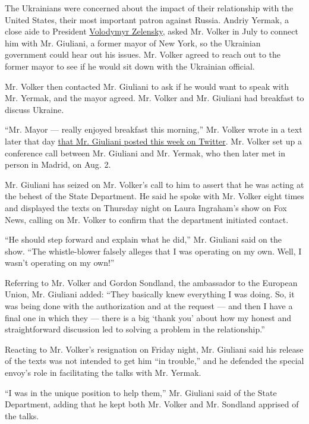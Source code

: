 The Ukrainians were concerned about the impact of their relationship
with the United States, their most important patron against Russia.
Andriy Yermak, a close aide to President
\href{https://www.nytimes.com/2019/09/25/world/europe/ukraine-trump-whistleblower-zelensky.html?module=inline}{Volodymyr
Zelensky}, asked Mr. Volker in July to connect him with Mr. Giuliani, a
former mayor of New York, so the Ukrainian government could hear out his
issues. Mr. Volker agreed to reach out to the former mayor to see if he
would sit down with the Ukrainian official.

Mr. Volker then contacted Mr. Giuliani to ask if he would want to speak
with Mr. Yermak, and the mayor agreed. Mr. Volker and Mr. Giuliani had
breakfast to discuss Ukraine.

``Mr. Mayor --- really enjoyed breakfast this morning,'' Mr. Volker
wrote in a text later that day
\href{https://twitter.com/RudyGiuliani/status/1177346278004539392}{that
Mr. Giuliani posted this week on Twitter}. Mr. Volker set up a
conference call between Mr. Giuliani and Mr. Yermak, who then later met
in person in Madrid, on Aug. 2.

Mr. Giuliani has seized on Mr. Volker's call to him to assert that he
was acting at the behest of the State Department. He said he spoke with
Mr. Volker eight times and displayed the texts on Thursday night on
Laura Ingraham's show on Fox News, calling on Mr. Volker to confirm that
the department initiated contact.

``He should step forward and explain what he did,'' Mr. Giuliani said on
the show. ``The whistle-blower falsely alleges that I was operating on
my own. Well, I wasn't operating on my own!''

Referring to Mr. Volker and Gordon Sondland, the ambassador to the
European Union, Mr. Giuliani added: ``They basically knew everything I
was doing. So, it was being done with the authorization and at the
request --- and then I have a final one in which they --- there is a big
`thank you' about how my honest and straightforward discussion led to
solving a problem in the relationship.''

Reacting to Mr. Volker's resignation on Friday night, Mr. Giuliani said
his release of the texts was not intended to get him ``in trouble,'' and
he defended the special envoy's role in facilitating the talks with Mr.
Yermak.

``I was in the unique position to help them,'' Mr. Giuliani said of the
State Department, adding that he kept both Mr. Volker and Mr. Sondland
apprised of the talks.

